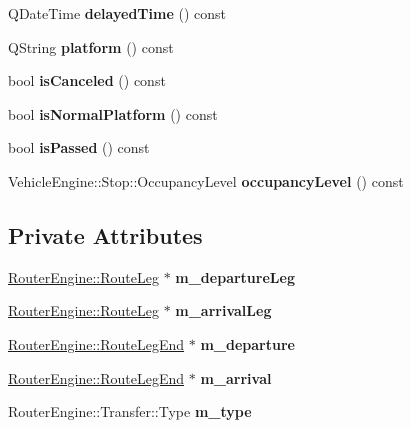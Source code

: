 \begin{DoxyCompactItemize}
Q\+Date\+Time {\bfseries delayed\+Time} () const
\item 
\mbox{\label{classRouterEngine_1_1Transfer_a74ddb24be5e96f945a7ac946b1201e9e}} 
Q\+String {\bfseries platform} () const
\item 
\mbox{\label{classRouterEngine_1_1Transfer_aff9e03cce26d0bee9e8871b796f5b0f3}} 
bool {\bfseries is\+Canceled} () const
\item 
\mbox{\label{classRouterEngine_1_1Transfer_aafcb639e843877555b6181ce8fe05e3c}} 
bool {\bfseries is\+Normal\+Platform} () const
\item 
\mbox{\label{classRouterEngine_1_1Transfer_adb3a0639e91faff1efed72fd37732f47}} 
bool {\bfseries is\+Passed} () const
\item 
\mbox{\label{classRouterEngine_1_1Transfer_ac5a0ffecfe78455585ff85c221e3441c}} 
Vehicle\+Engine\+::\+Stop\+::\+Occupancy\+Level {\bfseries occupancy\+Level} () const
\end{DoxyCompactItemize}
\subsection*{Private Attributes}
\begin{DoxyCompactItemize}
\item 
\mbox{\label{classRouterEngine_1_1Transfer_a40772fc03d985aa0f8820c9ad414e50a}} 
\mbox{\hyperlink{classRouterEngine_1_1RouteLeg}{Router\+Engine\+::\+Route\+Leg}} $\ast$ {\bfseries m\+\_\+departure\+Leg}
\item 
\mbox{\label{classRouterEngine_1_1Transfer_a3104b73a0130558587111a7ec4a6cfff}} 
\mbox{\hyperlink{classRouterEngine_1_1RouteLeg}{Router\+Engine\+::\+Route\+Leg}} $\ast$ {\bfseries m\+\_\+arrival\+Leg}
\item 
\mbox{\label{classRouterEngine_1_1Transfer_ac33555843efa0815443c47324c55480c}} 
\mbox{\hyperlink{classRouterEngine_1_1RouteLegEnd}{Router\+Engine\+::\+Route\+Leg\+End}} $\ast$ {\bfseries m\+\_\+departure}
\item 
\mbox{\label{classRouterEngine_1_1Transfer_a28ddd26907a602c03614ff89c78667ef}} 
\mbox{\hyperlink{classRouterEngine_1_1RouteLegEnd}{Router\+Engine\+::\+Route\+Leg\+End}} $\ast$ {\bfseries m\+\_\+arrival}
\item 
\mbox{\label{classRouterEngine_1_1Transfer_a029f1581f2c05784924898946fff9dc3}} 
Router\+Engine\+::\+Transfer\+::\+Type {\bfseries m\+\_\+type}
\end{DoxyCompactItemize}


